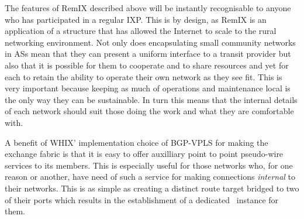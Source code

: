 The features of RemIX described above will be instantly recognisable
to anyone who has participated in a regular \ac{IXP}. This is by
design, as RemIX is an application of a structure that has allowed the
Internet to scale to the rural networking environment. Not only does
encapsulating small community networks in \acp{AS} mean that they can
present a uniform interface to a transit provider but also that it is
possible for them to cooperate and to share resources and yet for each
to retain the ability to operate their own network as they see
fit. This is very important because keeping as much of operations and
maintenance local is the only way they can be sustainable. In turn
this means that the internal details of each network should suit those
doing the work and what they are comfortable with.

A benefit of \ac{WHIX}' implementation choice of \ac{BGP}-\ac{VPLS}
for making the exchange fabric is that it is easy to offer auxilliary
point to point pseudo-wire services to its members. This is especially
useful for those networks who, for one reason or another, have need of
such a service for making connections \emph{internal} to their
networks. This is as simple as creating a distinct route target
bridged to two of their ports which results in the establishment of a
dedicated~\cite{VPLS} instance for them.
